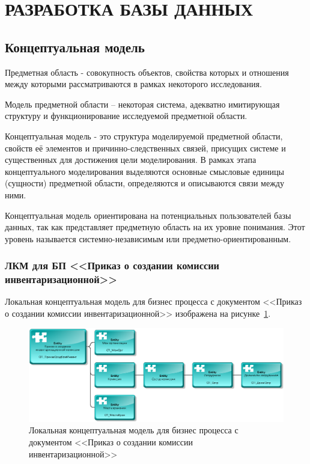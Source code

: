 \section{РАЗРАБОТКА БАЗЫ ДАННЫХ}
\subsection{Концептуальная модель}

Предметная область - совокупность объектов,
свойства которых и отношения между которыми рассматриваются в рамках некоторого исследования.

Модель предметной области – некоторая система, адекватно имитирующая
структуру и функционирование исследуемой предметной области.

Концептуальная модель - это структура моделируемой предметной области,
свойств её элементов и причинно-следственных связей, присущих системе и
существенных для достижения цели моделирования.
В рамках этапа концептуального моделирования выделяются основные смысловые единицы (сущности)
предметной области, определяются и описываются связи между ними.

Концептуальная модель ориентирована на потенциальных пользователей базы данных,
так как представляет предметную область на их уровне понимания.
Этот уровень называется системно-независимым или предметно-ориентированным.

\subsubsection{ЛКМ для БП <<Приказ о создании комиссии инвентаризационной>>}

Локальная концептуальная модель для бизнес процесса с документом <<Приказ о создании комиссии инвентаризационной>>
изображена на рисунке~\ref{fig:LKM_PrikazSozdKomInvent}.

\begin{figure}[!h]
    \centering
    \includegraphics[width=18cm]
        {_docs/ЛКМ_ПриказСоздКомИнвент.png}
    \caption{Локальная концептуальная модель для бизнес процесса с документом <<Приказ о создании комиссии инвентаризационной>>}
    \label{fig:LKM_PrikazSozdKomInvent}
\end{figure}

